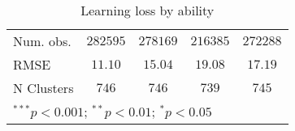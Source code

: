 \begin{table}
\begin{center}
\begin{tabular}{l c c c c}
Num. obs.                    & $282595$      & $278169$      & $216385$      & $272288$      \\
RMSE                         & $11.10$       & $15.04$       & $19.08$       & $17.19$       \\
N Clusters                   & $746$         & $746$         & $739$         & $745$         \\
\hline
\multicolumn{5}{l}{\scriptsize{$^{***}p<0.001$; $^{**}p<0.01$; $^{*}p<0.05$}}
\end{tabular}
\caption{Learning loss by ability}
\label{tableability}
\end{center}
\end{table}
